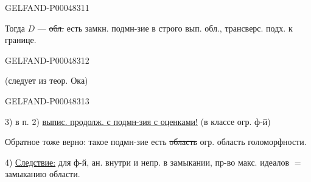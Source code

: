 \begin{GelfandAdjacentEvidence}{GELFAND-P000483}{11}


Тогда $D$ — \sout{обл.} есть замкн. подмн-зие в строго вып. обл.,
трансверс. подх. к границе.
\end{GelfandAdjacentEvidence}
\begin{GelfandAdjacentEvidence}{GELFAND-P000483}{12}


(следует из теор. Ока)
\end{GelfandAdjacentEvidence}
\begin{GelfandAdjacentEvidence}{GELFAND-P000483}{13}


3) в п. 2) \uline{выпис. продолж. с подмн-зия с оценками!} (в классе огр. ф-й)

Обратное тоже верно: такое подмн-зие есть \sout{область} огр. область голоморфности.
\end{GelfandAdjacentEvidence}


4) \uline{Следствие:} для ф-й, ан. внутри и непр. в замыкании,
пр-во макс. идеалов $=$ замыканию области.


